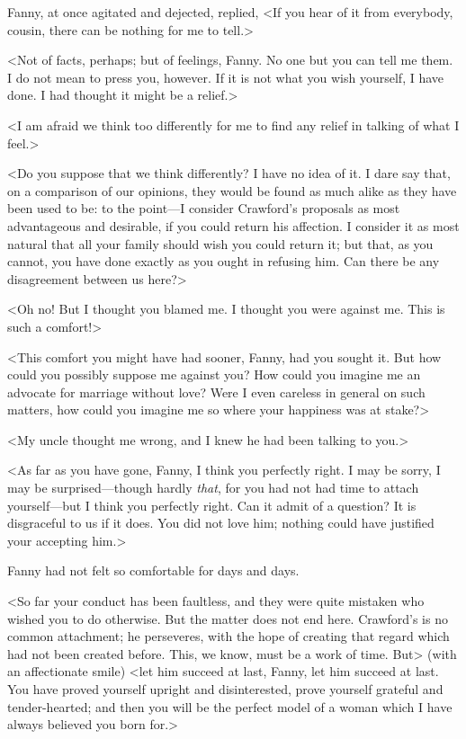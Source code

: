 Fanny, at once agitated and dejected, replied, <If you hear of it from everybody, cousin, there can be nothing for me to tell.>

<Not of facts, perhaps; but of feelings, Fanny. No one but you can tell me them. I do not mean to press you, however. If it is not what you wish yourself, I have done. I had thought it might be a relief.>

<I am afraid we think too differently for me to find any relief in talking of what I feel.>

<Do you suppose that we think differently? I have no idea of it. I dare say that, on a comparison of our opinions, they would be found as much alike as they have been used to be: to the point—I consider Crawford's proposals as most advantageous and desirable, if you could return his affection. I consider it as most natural that all your family should wish you could return it; but that, as you cannot, you have done exactly as you ought in refusing him. Can there be any disagreement between us here?>

<Oh no! But I thought you blamed me. I thought you were against me. This is such a comfort!>

<This comfort you might have had sooner, Fanny, had you sought it. But how could you possibly suppose me against you? How could you imagine me an advocate for marriage without love? Were I even careless in general on such matters, how could you imagine me so where your happiness was at stake?>

<My uncle thought me wrong, and I knew he had been talking to you.>

<As far as you have gone, Fanny, I think you perfectly right. I may be sorry, I may be surprised—though hardly \textit{that}, for you had not had time to attach yourself—but I think you perfectly right. Can it admit of a question? It is disgraceful to us if it does. You did not love him; nothing could have justified your accepting him.>

Fanny had not felt so comfortable for days and days.

<So far your conduct has been faultless, and they were quite mistaken who wished you to do otherwise. But the matter does not end here. Crawford's is no common attachment; he perseveres, with the hope of creating that regard which had not been created before. This, we know, must be a work of time. But> (with an affectionate smile) <let him succeed at last, Fanny, let him succeed at last. You have proved yourself upright and disinterested, prove yourself grateful and tender-hearted; and then you will be the perfect model of a woman which I have always believed you born for.>

